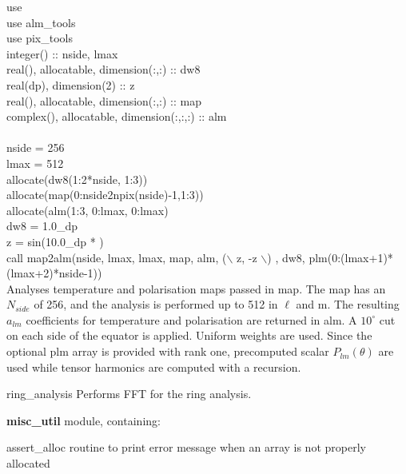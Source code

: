 \begin{example}
{
use \\
use alm\_tools\\
use pix\_tools\\
integer() :: nside, lmax \\
real(), allocatable, dimension(:,:) :: dw8 \\
real(dp), dimension(2) :: z \\
real(), allocatable, dimension(:,:) :: map \\
complex(), allocatable, dimension(:,:,:) :: alm \\
\\
nside = 256 \\
lmax = 512 \\
allocate(dw8(1:2*nside, 1:3)) \\
allocate(map(0:nside2npix(nside)-1,1:3)) \\
allocate(alm(1:3, 0:lmax, 0:lmax)\\
dw8 = 1.0\_dp \\
z = sin(10.0\_dp * ) \\
call map2alm(nside, lmax, lmax, map, alm, ($\backslash$ z, -z $\backslash$) , dw8, plm(0:(lmax+1)*(lmax+2)*nside-1))  \\
}
{
Analyses temperature and polarisation maps passed in map. The map has
an $N_{side}$ of 256, and the analysis is performed up
to 512 in $\ell$ and m. The resulting $a_{lm}$ coefficients for
temperature and polarisation are returned in alm. A $10^\circ$ cut on
each side of the equator is applied. Uniform weights are used. Since
the optional plm array is provided with rank one, precomputed scalar $P_{lm}(\theta)$ are
used while tensor harmonics are computed with a recursion.
}
\end{example}

\begin{modules}
  \begin{sulist}{} %
  \item[ring\_analysis] Performs FFT for the ring analysis.
  \item[\textbf{misc\_util}] module, containing:
  \item[assert\_alloc] routine to print error message when an array is not
  properly allocated		
  \end{sulist}
\end{modules}

